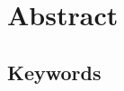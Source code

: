 
\bigskip\bigskip\bigskip\bigskip\bigskip
\section*{Abstract}
\noindent
\AbstraktEN
\subsection*{Keywords}
\noindent
\KlicovaSlovaEN

\openright
